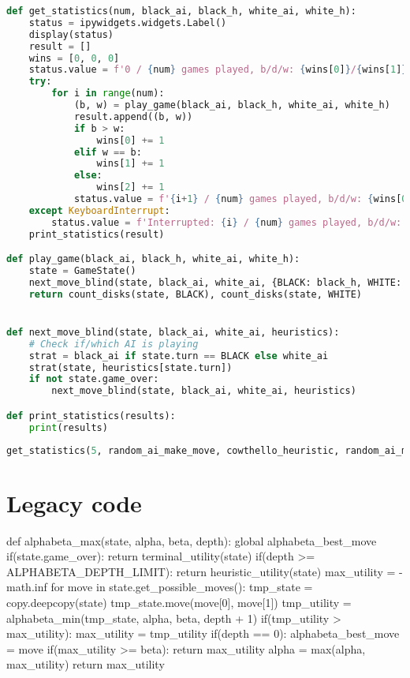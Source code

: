 \begin{lstlisting}[language=Python]
def get_statistics(num, black_ai, black_h, white_ai, white_h):
    status = ipywidgets.widgets.Label()
    display(status)
    result = []
    wins = [0, 0, 0]
    status.value = f'0 / {num} games played, b/d/w: {wins[0]}/{wins[1]}/{wins[2]}'
    try:
        for i in range(num):
            (b, w) = play_game(black_ai, black_h, white_ai, white_h)
            result.append((b, w))
            if b > w:
                wins[0] += 1
            elif w == b:
                wins[1] += 1
            else:
                wins[2] += 1
            status.value = f'{i+1} / {num} games played, b/d/w: {wins[0]}/{wins[1]}/{wins[2]}'
    except KeyboardInterrupt:
        status.value = f'Interrupted: {i} / {num} games played, b/d/w: {wins[0]}/{wins[1]}/{wins[2]}'
    print_statistics(result)

def play_game(black_ai, black_h, white_ai, white_h):
    state = GameState()
    next_move_blind(state, black_ai, white_ai, {BLACK: black_h, WHITE: white_h})
    return count_disks(state, BLACK), count_disks(state, WHITE)


def next_move_blind(state, black_ai, white_ai, heuristics):
    # Check if/which AI is playing
    strat = black_ai if state.turn == BLACK else white_ai
    strat(state, heuristics[state.turn])
    if not state.game_over:
        next_move_blind(state, black_ai, white_ai, heuristics)

def print_statistics(results):
    print(results)
\end{lstlisting}

\begin{lstlisting}[language=Python]
get_statistics(5, random_ai_make_move, cowthello_heuristic, random_ai_make_move, cowthello_heuristic)
\end{lstlisting}

\hypertarget{legacy-code}{%
\section{Legacy code}\label{legacy-code}}

def alphabeta\_max(state, alpha, beta, depth): global
alphabeta\_best\_move if(state.game\_over): return
terminal\_utility(state) if(depth \textgreater=
ALPHABETA\_DEPTH\_LIMIT): return heuristic\_utility(state) max\_utility
= -math.inf for move in state.get\_possible\_moves(): tmp\_state =
copy.deepcopy(state) tmp\_state.move(move{[}0{]}, move{[}1{]})
tmp\_utility = alphabeta\_min(tmp\_state, alpha, beta, depth + 1)
if(tmp\_utility \textgreater{} max\_utility): max\_utility =
tmp\_utility if(depth == 0): alphabeta\_best\_move = move
if(max\_utility \textgreater= beta): return max\_utility alpha =
max(alpha, max\_utility) return max\_utility

